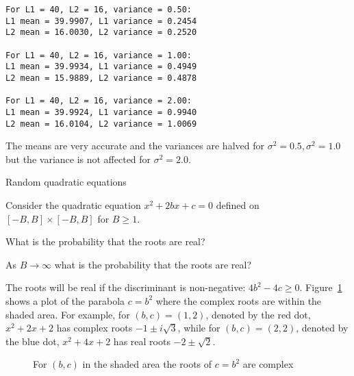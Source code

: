 \begin{verbatim}
For L1 = 40, L2 = 16, variance = 0.50:
L1 mean = 39.9907, L1 variance = 0.2454
L2 mean = 16.0030, L2 variance = 0.2520

For L1 = 40, L2 = 16, variance = 1.00:
L1 mean = 39.9934, L1 variance = 0.4949
L2 mean = 15.9889, L2 variance = 0.4878

For L1 = 40, L2 = 16, variance = 2.00:
L1 mean = 39.9924, L1 variance = 0.9940
L2 mean = 16.0104, L2 variance = 1.0069
\end{verbatim}
The means are very accurate and the variances are halved for $\sigma^2=0.5,\sigma^2=1.0$ but the variance is not affected for $\sigma^2=2.0$.


\begin{prob}{Random quadratic equations}

Consider the quadratic equation $x^2+2bx+c=0$ defined on $[-B,B]\times[-B,B]$ for $B\geq 1$.

 What is the probability that the roots are real?

 As $B\rightarrow \infty$ what is the probability that the roots are real?
\end{prob}

\solution{}

The roots will be real if the discriminant is non-negative: $4b^2-4c\geq 0$. Figure~\ref{f.real-roots} shows a plot of the parabola $c=b^2$ where the complex roots are within the shaded area. For example, for $(b,c)=(1,2)$, denoted by the red dot, $x^2+2x+2$ has complex roots $-1\pm i\sqrt{3}$, while for $(b,c)=(2,2)$, denoted by the blue dot, $x^2+4x+2$ has real roots $-2\pm \sqrt{2}$.
\begin{figure}[tb]
\begin{center}
\end{center}
\caption{For $(b,c)$ in the shaded area the roots of $c=b^2$ are complex}\label{f.real-roots}
\end{figure}

